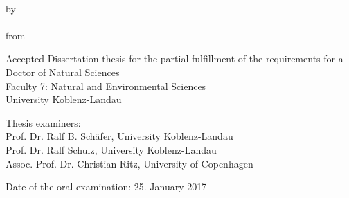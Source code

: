 \begin{titlepage}
    \begin{center}
        \begingroup
            \vspace{5cm}
            \textbf{\LARGE\spacedallcaps{\myTitleOnTitlePageLineOne}}\\[0.5em]
            \spacedallcaps{\myTitleOnTitlePageLineTwo}
        \endgroup
        
        \vfill

        \begingroup
            by\\[1em]
            \Large \spacedlowsmallcaps{\myName} \\
            \small from \spacedlowsmallcaps{\myLocation}
        \endgroup

        \vfill

        \begingroup
            \small
            Accepted Dissertation thesis for the partial fulfillment of the requirements for a \\
            Doctor of Natural Sciences \\
            Faculty 7: Natural and Environmental Sciences \\
            University Koblenz-Landau
        \endgroup

        \vfill

        \begingroup
            \small
            Thesis examiners: \\
            Prof. Dr. Ralf B. Schäfer, University Koblenz-Landau \\
            Prof. Dr. Ralf Schulz, University Koblenz-Landau\\
            Assoc. Prof. Dr. Christian Ritz, University of Copenhagen
        \endgroup

        \vfill

        \begingroup
            \small
            Date of the oral examination: 25. January 2017
        \endgroup
                           

    \end{center}       
\end{titlepage}   
 
